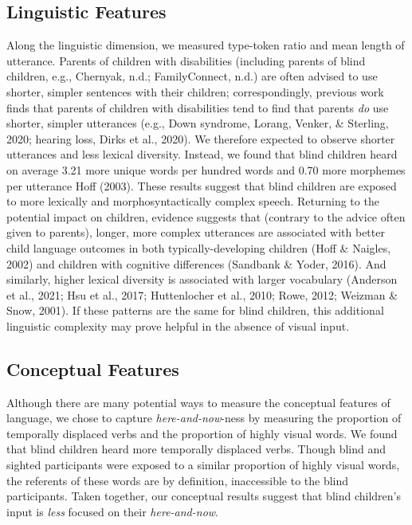 \documentclass[
  man]{apa6}
\begin{document}
\hypertarget{linguistic-features-2}{%
\subsection{Linguistic Features}\label{linguistic-features-2}}

Along the linguistic dimension, we measured type-token ratio and mean length of utterance. Parents of children with disabilities (including parents of blind children, e.g., Chernyak, n.d.; FamilyConnect, n.d.) are often advised to use shorter, simpler sentences with their children; correspondingly, previous work finds that parents of children with disabilities tend to find that parents \emph{do} use shorter, simpler utterances (e.g., Down syndrome, Lorang, Venker, \& Sterling, 2020; hearing loss, Dirks et al., 2020). We therefore expected to observe shorter utterances and less lexical diversity. Instead, we found that blind children heard on average 3.21 more unique words per hundred words and 0.70 more morphemes per utterance Hoff (2003). These results suggest that blind children are exposed to more lexically and morphosyntactically complex speech. Returning to the potential impact on children, evidence suggests that (contrary to the advice often given to parents), longer, more complex utterances are associated with better child language outcomes in both typically-developing children (Hoff \& Naigles, 2002) and children with cognitive differences (Sandbank \& Yoder, 2016). And similarly, higher lexical diversity is associated with larger vocabulary (Anderson et al., 2021; Hsu et al., 2017; Huttenlocher et al., 2010; Rowe, 2012; Weizman \& Snow, 2001). If these patterns are the same for blind children, this additional linguistic complexity may prove helpful in the absence of visual input.

\hypertarget{conceptual-features-2}{%
\subsection{Conceptual Features}\label{conceptual-features-2}}

Although there are many potential ways to measure the conceptual features of language, we chose to capture \emph{here-and-now}-ness by measuring the proportion of temporally displaced verbs and the proportion of highly visual words. We found that blind children heard more temporally displaced verbs. Though blind and sighted participants were exposed to a similar proportion of highly visual words, the referents of these words are by definition, inaccessible to the blind participants. Taken together, our conceptual results suggest that blind children's input is \emph{less} focused on their \emph{here-and-now}.
\end{document}
